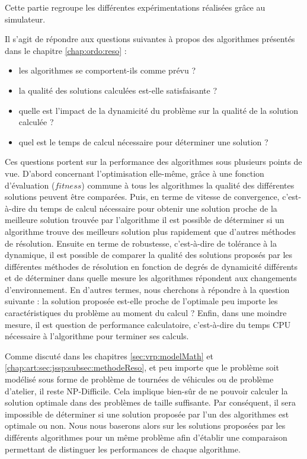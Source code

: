 
Cette partie regroupe les différentes expérimentations réalisées grâce au simulateur. 


Il s'agit de répondre aux questions suivantes à propos des algorithmes présentés dans le chapitre \ref{chap:ordo:reso} :
\begin{itemize}
 \item les algorithmes se comportent-ils comme prévu ?
 \item la qualité des solutions calculées est-elle satisfaisante ?
 \item quelle est l'impact de la dynamicité du problème sur la qualité de la solution calculée ?
 \item quel est le temps de calcul nécessaire pour déterminer une solution ?
 \end{itemize}

Ces questions portent sur la performance des algorithmes sous plusieurs points de vue. D'abord concernant l'optimisation elle-même, grâce à une fonction d'évaluation ($fitness$) commune à tous les algorithmes la qualité des différentes solutions peuvent être comparées. 
Puis, en terme de vitesse de convergence, c'est-à-dire  du temps de calcul nécessaire pour obtenir une solution proche de la meilleure solution trouvée par l'algorithme il est possible de déterminer si un algorithme trouve des meilleurs solution plus rapidement que d'autres méthodes de résolution. 
Ensuite en terme de robustesse, c'est-à-dire de tolérance à la dynamique, il est possible de comparer la qualité des solutions proposés par les différentes méthodes de résolution en fonction de degrés de dynamicité différents et de déterminer dans quelle mesure les algorithmes répondent aux changements d'environnement. En d'autres termes, nous cherchons à répondre à la question suivante : la solution proposée est-elle proche de l'optimale peu importe les caractéristiques du problème au moment du calcul ?
Enfin, dans une moindre mesure, il est question de performance calculatoire, c'est-à-dire du temps CPU nécessaire à l'algorithme pour terminer ses calculs.


Comme discuté dans les chapitres \ref{sec:vrp:modelMath} et \ref{chap:art:sec:jssp:subsec:methodeReso}, et peu importe que le problème soit modélisé sous forme de problème de tournées de véhicules ou de problème d'atelier, il reste NP-Difficile. 
Cela implique bien-sûr de ne pouvoir calculer la solution optimale dans des problèmes de taille suffisante.
Par conséquent, il sera impossible de déterminer si une solution proposée par l'un des algorithmes est optimale ou non.
Nous nous baserons alors sur les solutions proposées par les différents algorithmes pour un même problème afin d'établir une comparaison permettant de distinguer les performances de chaque algorithme.

